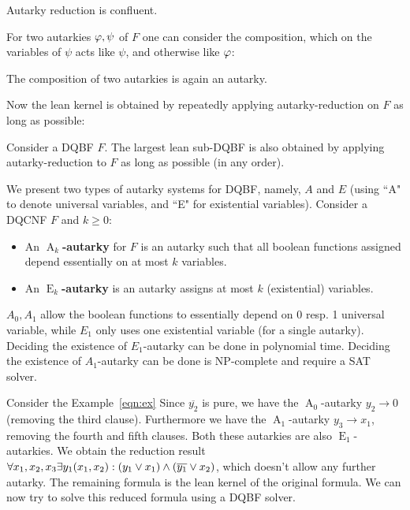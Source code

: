\documentclass[conference]{IEEEtran}
\DeclareMathOperator{\Aaut}{A}
\DeclareMathOperator{\Eaut}{E}
\begin{document}
\begin{lem}\label{lem:compaut}
Autarky reduction is confluent.
\end{lem}

For two autarkies $\varphi, \psi$ of $F$ one can consider the composition, %
 which on the variables of $\psi$ acts like $\psi$, and otherwise like $\varphi$: \vspace{-1em}
\begin{lem}\label{lem:compaut}
	The composition of two autarkies is again an autarky.
\end{lem}
Now the lean kernel is obtained by repeatedly applying autarky-reduction on $F$ as long as possible:
\vspace{-1em}
\begin{lem}\label{lem:decomp}
	Consider a DQBF $F$. The largest lean sub-DQBF is also obtained by applying autarky-reduction to $F$ as long as possible (in any order).
\end{lem}

We present two types of autarky systems for DQBF, namely, $A$ and $E$ (using ``A" to denote universal variables, and ``E" for existential variables).
%
Consider a DQCNF $F$ and $k \ge 0$:
\begin{itemize}
	\item An \textbf{$\Aaut_k$-autarky} for $F$ is an autarky such that all boolean functions assigned depend essentially on at most $k$ variables.
	\item An \textbf{$\Eaut_k$-autarky} is an autarky assigns at most $k$ (existential) variables.
\end{itemize}

$A_0, A_1$ allow the boolean functions to essentially depend on 0 resp. 1 universal variable, while $E_1$ only uses one existential variable (for a single autarky).
%
Deciding the existence of $E_1$-autarky can be done in polynomial time.
%
Deciding the existence of $A_1$-autarky can be done is NP-complete and require a SAT solver.

Consider the Example~\ref{eqn:ex}
Since $\overline{y_2}$ is pure, we have the $\Aaut_0$-autarky $y_2 \rightarrow 0$ (removing the third clause).
Furthermore we have the $\Aaut_1$-autarky $y_3 \rightarrow x_1$, removing the fourth and fifth clauses.
Both these autarkies are also $\Eaut_1$-autarkies.
We obtain the reduction result $\forall x_1,x_2,x_3 \exists y_1(x_1,x_2) : (y_1 \vee x_1) \wedge (\overline{y_1} \vee x_2)$, 
which doesn't allow any further autarky. 
%
The remaining formula is the lean kernel of the original formula.
%
We can now try to solve this reduced formula using a DQBF solver.
\end{document}
